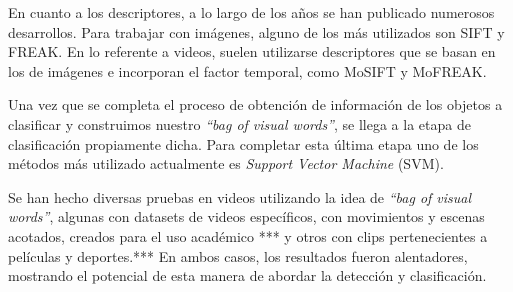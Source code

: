 En cuanto a los descriptores, a lo largo de los años se han publicado numerosos desarrollos. Para trabajar con imágenes, alguno de los más utilizados
son SIFT y FREAK. En lo referente a videos, suelen utilizarse descriptores que se basan en los de imágenes e incorporan el factor temporal,
como MoSIFT y MoFREAK.

Una vez que se completa el proceso de obtención de información de los objetos a clasificar y construimos nuestro \textit{\textquotedblleft bag of visual
words\textquotedblright}, se llega a la etapa de clasificación propiamente dicha. Para completar esta última etapa uno de los métodos más utilizado
actualmente es \textit{Support Vector Machine} (SVM).

Se han hecho diversas pruebas en videos utilizando la idea de \textit{\textquotedblleft bag of visual words\textquotedblright}, algunas con
datasets de videos específicos, con movimientos y escenas acotados, creados para el uso académico *** y otros con clips pertenecientes a películas
y deportes.*** En ambos casos, los resultados fueron alentadores, mostrando el potencial de esta manera de abordar la detección y clasificación.